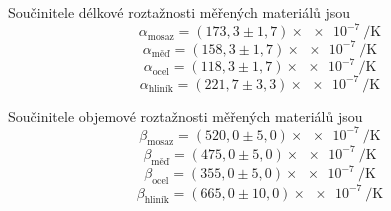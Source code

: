 \documentclass[protokol.tex]{subfiles}
\begin{document}
Součinitele délkové roztažnosti měřených materiálů jsou
$$ \alpha_{\text{mosaz}}  = (173,3 \pm 1,7) \times \num{e-7} \ \si{\per\kelvin} $$ 	
$$ \alpha_{\text{měď}}    = (158,3 \pm 1,7) \times \num{e-7} \ \si{\per\kelvin} $$
$$ \alpha_{\text{ocel}}   = (118,3 \pm 1,7) \times \num{e-7} \ \si{\per\kelvin} $$
$$ \alpha_{\text{hliník}} = (221,7 \pm 3,3) \times \num{e-7} \ \si{\per\kelvin} $$

Součinitele objemové roztažnosti měřených materiálů jsou
$$ \beta_{\text{mosaz}}  = (520,0 \pm 5,0)  \times \num{e-7} \ \si{\per\kelvin} $$
$$ \beta_{\text{měď}}    = (475,0 \pm 5,0)  \times \num{e-7} \ \si{\per\kelvin} $$
$$ \beta_{\text{ocel}}   = (355,0 \pm 5,0)  \times \num{e-7} \ \si{\per\kelvin} $$
$$ \beta_{\text{hliník}} = (665,0 \pm 10,0) \times \num{e-7} \ \si{\per\kelvin} $$
\end{document}
